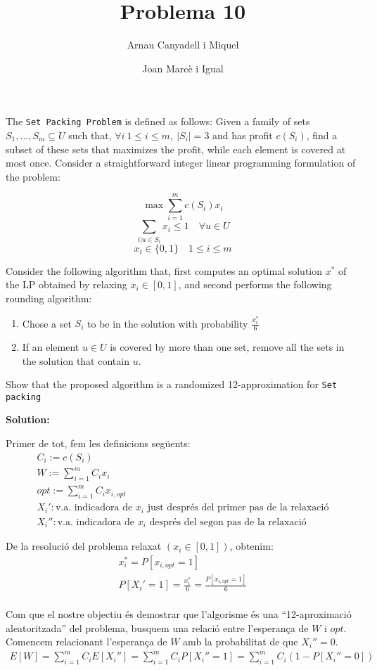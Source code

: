 \documentclass[a4paper]{article}
\title{Problema 10}
\author{Arnau Canyadell i Miquel \and Joan Marcè i Igual}
\date{}
\begin{document}
\maketitle

The \texttt{Set Packing Problem} is defined as follows: Given a family of sets $S_1,...,S_m \subseteq U$ such that, $\forall i \ 1 \le i \le m,\ |S_i|=3$ and has profit $c(S_i)$, find a subset of these sets that maximizes the profit, while each element is covered at most once. Consider a straightforward integer linear programming formulation of the problem:

$$
\max \sum_{i=1}^m c(S_i)x_i
$$
$$
\sum_{i|u\in S_i} x_i \le 1 \quad \forall u \in U
$$
$$
x_i \in \{0, 1\} \quad 1 \le i \le m
$$

Consider the following algorithm that, first computes an optimal solution $x^*$ of the LP obtained by relaxing $x_i \in [0, 1]$, and second performs the following rounding algorithm:
\begin{enumerate}
	\item Chose a set $S_i$ to be in the solution with probability $\frac{x_i^*}{6}$
	\item If an element $u\in U$ is covered by more than one set, remove all the sets in the solution that contain $u$.
\end{enumerate}

Show that the proposed algorithm is a randomized 12-approximation for \texttt{Set packing}

\textbf{Solution:}

Primer de tot, fem les definicions següents:
\begin{gather*}
	C_i := c(S_i) \\
	W := \sum_{i=1}^{m} C_i x_i \\
	opt := \sum_{i=1}^{m} C_i x_{i,opt} \\
	X_i': \text{v.a. indicadora de $x_i$ just després del primer pas de la relaxació} \\
	X_i'': \text{v.a. indicadora de $x_i$ després del segon pas de la relaxació}
\end{gather*}

De la resolució del problema relaxat $(x_i \in [0,1])$, obtenim:
\begin{gather*}
	x_i^* = P[x_{i,opt} = 1] \\
	P[X_i' = 1] = \frac{x_i^*}{6} = \frac{P[x_{i,opt} = 1]}{6} \\
\end{gather*}

Com que el nostre objectiu és demostrar que l'algorisme és una ``12-aproximació aleatoritzada'' del problema, busquem una relació entre l'esperança de $W$ i $opt$. Comencem relacionant l'esperança de $W$ amb la probabilitat de que $X_i'' = 0$.
\begin{gather*}
	E[W] = \sum_{i=1}^{m} C_i E[X_i''] = \sum_{i=1}^{m} C_i P[X_i'' = 1] = \sum_{i=1}^{m} C_i (1 - P[X_i'' = 0])
\end{gather*}
\end{document}
